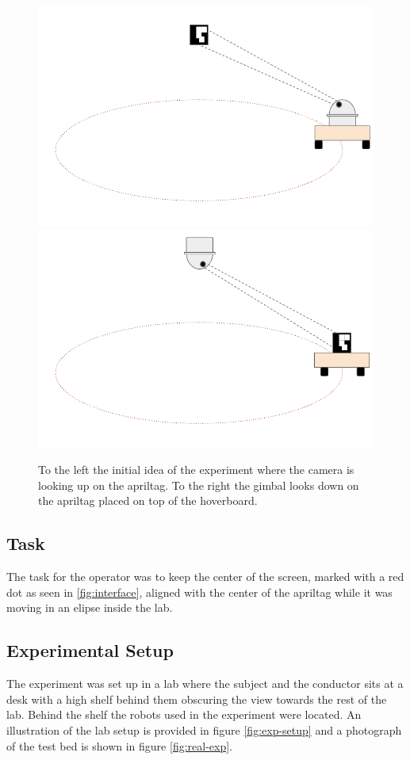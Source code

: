 \documentclass[nofilelist]{cslthse-msc}
\begin{document}
\begin{figure}[htp]
   \centering
   \includegraphics[width=.47\textwidth]{images/testbed1.png}\hfill
   \includegraphics[width=.47\textwidth]{images/testbed2.png}
   \caption{To the left the initial idea of the experiment where the camera is looking up on the apriltag. To the right the gimbal looks down on the apriltag placed on top of the hoverboard.}
   \label{fig:testbed-ideas}
\end{figure}

\subsection{Task}
The task for the operator was to keep the center of the screen, marked with a red dot as seen in \ref{fig:interface}, aligned with the center of the apriltag while it was moving in an elipse inside the lab.

\subsection{Experimental Setup}
The experiment was set up in a lab where the subject and the conductor sits at a desk with a high shelf behind them obscuring the view towards the rest of the lab. Behind the shelf the robots used in the experiment were located. An illustration of the lab setup is provided in figure \ref{fig:exp-setup} and a photograph of the test bed is shown in figure \ref{fig:real-exp}.
\end{document}
